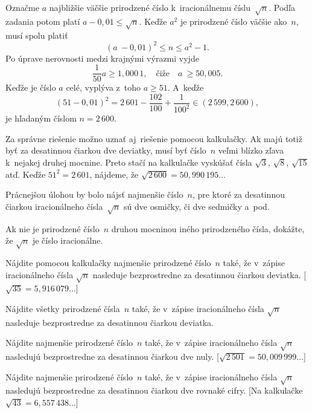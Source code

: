 {%
Označme $a$ najbližšie väčšie prirodzené číslo k~iracionálnemu číslu~$\sqrt n$.
Podľa zadania potom platí $a-0{,}01 \le\sqrt n$. Keďže $a^2$ je prirodzené číslo
väčšie ako~$n$, musí spolu platiť
$$
(a~- 0{,}01)^2 \le n \le a^2-1.
$$
Po úprave nerovnosti medzi krajnými výrazmi vyjde
$$
\frac{1}{50}a \ge 1{,}000\,1, \quad\text{čiže}\quad a~\ge 50{,}005.
$$
Keďže je číslo $a$ celé, vyplýva z~toho $a\ge51$. A~keďže
$$
(51-0{,}01)^2 = 2\,601 - \frac{102}{100} + \frac{1}{100^2} \in(2\,599, 2\,600),
$$
je hľadaným číslom $n = 2\,600$.


\poznamka
Za správne riešenie možno uznať aj~riešenie pomocou kalkulačky. Ak majú totiž byť za
desatinnou čiarkou dve deviatky, musí byť číslo~$n$ veľmi blízko zľava k~nejakej druhej
mocnine. Preto stačí na kalkulačke vyskúšať čísla $\sqrt 3$, $\sqrt 8$, $\sqrt {15}$
atď. Keďže $51^2 = 2\,601$, nájdeme, že $\sqrt {2\,600} = 50{,}990\,195\dots$

Prácnejšou úlohou by bolo nájsť najmenšie číslo~$n$, pre ktoré za desatinnou čiarkou iracionálneho
čísla~$\sqrt n$ sú dve osmičky, či dve sedmičky a~pod.



Ak nie je prirodzené číslo~$n$ druhou mocninou iného prirodzeného čísla, dokážte, že
$\sqrt n$ je číslo iracionálne.

Nájdite pomocou kalkulačky najmenšie prirodzené číslo~$n$ také, že v~zápise
iracionálneho čísla $\sqrt n$ nasleduje bezprostredne za desatinnou čiarkou deviatka.
[$\sqrt {35} = 5{,}916\,079 \dots$]

Nájdite všetky prirodzené čísla~$n$ také, že v~zápise iracionálneho čísla $\sqrt
n$ nasleduje bezprostredne za desatinnou čiarkou deviatka.

Nájdite najmenšie prirodzené číslo~$n$ také, že v~zápise iracionálneho čísla $\sqrt
n$ nasledujú bezprostredne za desatinnou čiarkou dve nuly. [$\sqrt {2\,501} =
50{,}009\,999 \dots$]

Nájdite najmenšie prirodzené číslo~$n$ také, že v~zápise iracionálneho čísla $\sqrt
n$ nasledujú bezprostredne za desatinnou čiarkou dve rovnaké cifry. [Na kalkulačke
$\sqrt {43} = 6{,}557\,438 \dots$]
}

